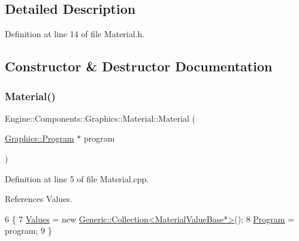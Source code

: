 \subsection{Detailed Description}


Definition at line 14 of file Material.\+h.



\subsection{Constructor \& Destructor Documentation}
\mbox{\label{classEngine_1_1Components_1_1Graphics_1_1Material_aefc17351f5af8ca7227e2a8144e141de}} 
\subsubsection{\texorpdfstring{Material()}{Material()}}
{\footnotesize\ttfamily Engine\+::\+Components\+::\+Graphics\+::\+Material\+::\+Material (\begin{DoxyParamCaption}\item[{\mbox{\hyperlink{classEngine_1_1Components_1_1Graphics_1_1Program}{Graphics\+::\+Program}} $\ast$}]{program }\end{DoxyParamCaption})}



Definition at line 5 of file Material.\+cpp.



References Values.


\begin{DoxyCode}
6 \{
7     \mbox{\hyperlink{classEngine_1_1Components_1_1Graphics_1_1Material_a34335608ba1e6eb2c2dba5032107eab0}{Values}} = \textcolor{keyword}{new} \mbox{\hyperlink{classGeneric_1_1Collection}{Generic::Collection<MaterialValueBase*>}}();
8     \mbox{\hyperlink{classEngine_1_1Components_1_1Graphics_1_1Material_a2a4084db93bb70cd65032baf296803d6}{Program}} = program;
9 \}
\end{DoxyCode}
\mbox{\label{classEngine_1_1Components_1_1Graphics_1_1Material_a30532acd75ec38c01db2b5c21776710b}} 

